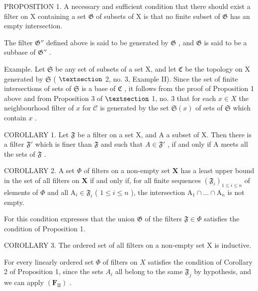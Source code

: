 PROPOSITION 1. A necessary and sufficient condition that there should exist a filter on X containing a set \(\mathfrak{G}\) of subsets of X is that no finite subset of \(\mathfrak{G}\) has an empty intersection.

The filter \(\mathfrak{G}''\) defined above is said to be generated by \(\mathfrak{G}\) , and \(\mathfrak{G}\) is said to be a subbase of \(\mathfrak{G}''\) .

Example. Let \(\mathfrak{S}\) be any set of subsets of a set X, and let \(\mathfrak{C}\) be the topology on X generated by \(\mathfrak{S}\) ( \(\S\) 2, no. 3, Example II). Since the set of finite intersections of sets of \(\mathfrak{S}\) is a base of \(\mathfrak{C}\) , it follows from the proof of Proposition 1 above and from Proposition 3 of \(\S\) 1, no. 3 that for each \(x \in X\) the neighbourhood filter of \(x\) for \(\mathcal{C}\) is generated by the set \(\mathfrak{S}(x)\) of sets of \(\mathfrak{S}\) which contain \(x\) .

COROLLARY 1. Let \(\mathfrak{F}\) be a filter on a set X, and A a subset of X. Then there is a filter \(\mathfrak{F}'\) which is finer than \(\mathfrak{F}\) and such that \(A \in \mathfrak{F}'\) , if and only if A meets all the sets of \(\mathfrak{F}\) .

COROLLARY 2. A set \(\Phi\) of filters on a non-empty set \(\mathbf{X}\) has a least upper bound in the set of all filters on \(\mathbf{X}\) if and only if, for all finite sequences \((\mathfrak{F}_i)_{1\leqslant i\leqslant n}\) of elements of \(\Phi\) and all \(\mathrm{A}_i\in \mathfrak{F}_i\) ( \(1\leqslant i\leqslant n\) ), the intersection \(\mathrm{A}_1\cap \dots \cap \mathrm{A}_n\) is not empty.

For this condition expresses that the union \(\mathfrak{G}\) of the filters \(\mathfrak{F} \in \Phi\) satisfies the condition of Proposition 1.

COROLLARY 3. The ordered set of all filters on a non-empty set X is inductive.

For every linearly ordered set \(\Phi\) of filters on \(X\) satisfies the condition of Corollary 2 of Proposition 1, since the sets \(A_{i}\) all belong to the same \(\mathfrak{F}_{j}\) by hypothesis, and we can apply \((\mathbf{F}_{\mathrm{II}})\) .

